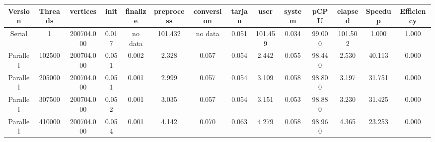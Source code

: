 \begin{tabular}{|c|c|c|c|c|c|c|c|c|c|c|c|c|c|}
\toprule
 Version &  Threads &   vertices &  init & finalize &  preprocess & conversion &  tarjan &    user &  system &   pCPU &  elapsed &  Speedup &  Efficiency \\
\midrule
  Serial &        1 & 200704.000 & 0.017 &  no data &     101.432 &    no data &   0.051 & 101.459 &   0.034 & 99.000 &  101.502 &    1.000 &       1.000 \\
Parallel &   102500 & 200704.000 & 0.051 &    0.002 &       2.328 &      0.057 &   0.054 &   2.442 &   0.055 & 98.440 &    2.530 &   40.113 &       0.000 \\
Parallel &   205000 & 200704.000 & 0.051 &    0.001 &       2.999 &      0.057 &   0.054 &   3.109 &   0.058 & 98.800 &    3.197 &   31.751 &       0.000 \\
Parallel &   307500 & 200704.000 & 0.052 &    0.001 &       3.035 &      0.057 &   0.054 &   3.151 &   0.053 & 98.880 &    3.230 &   31.425 &       0.000 \\
Parallel &   410000 & 200704.000 & 0.054 &    0.001 &       4.142 &      0.070 &   0.063 &   4.279 &   0.058 & 98.960 &    4.365 &   23.253 &       0.000 \\
\bottomrule
\end{tabular}
